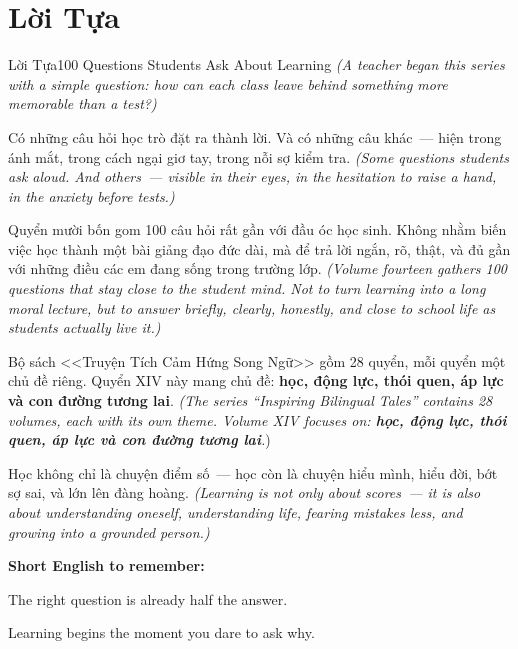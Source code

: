 \chapter*{Lời Tựa}

\begin{truyen}{Lời Tựa}{100 Questions Students Ask About Learning}
\textit{(A teacher began this series with a simple question: how can each class leave behind something more memorable than a test?)}

Có những câu hỏi học trò đặt ra thành lời. Và có những câu khác~--- hiện trong ánh mắt, trong cách ngại giơ tay, trong nỗi sợ kiểm tra.
\textit{(Some questions students ask aloud. And others~--- visible in their eyes, in the hesitation to raise a hand, in the anxiety before tests.)}

Quyển mười bốn gom 100 câu hỏi rất gần với đầu óc học sinh. Không nhằm biến việc học thành một bài giảng đạo đức dài, mà để trả lời ngắn, rõ, thật, và đủ gần với những điều các em đang sống trong trường lớp.
\textit{(Volume fourteen gathers 100 questions that stay close to the student mind. Not to turn learning into a long moral lecture, but to answer briefly, clearly, honestly, and close to school life as students actually live it.)}

Bộ sách <<Truyện Tích Cảm Hứng Song Ngữ>> gồm 28 quyển, mỗi quyển một chủ đề riêng. Quyển XIV này mang chủ đề: \textbf{học, động lực, thói quen, áp lực và con đường tương lai}.
\textit{(The series ``Inspiring Bilingual Tales'' contains 28 volumes, each with its own theme. Volume XIV focuses on: \textbf{học, động lực, thói quen, áp lực và con đường tương lai}.})
\end{truyen}

\begin{baihoc}
Học không chỉ là chuyện điểm số~--- học còn là chuyện hiểu mình, hiểu đời, bớt sợ sai, và lớn lên đàng hoàng.
\textit{(Learning is not only about scores~--- it is also about understanding oneself, understanding life, fearing mistakes less, and growing into a grounded person.)}
\end{baihoc}

\begin{ghinhoanh}
\textbf{Short English to remember:}

The right question is already half the answer.

Learning begins the moment you dare to ask why.
\end{ghinhoanh}

